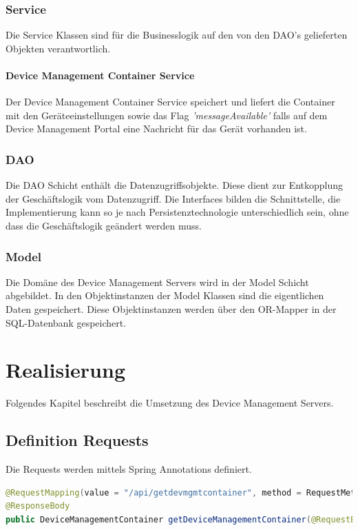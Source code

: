 \subsubsection{Service}
Die Service Klassen sind für die Businesslogik auf den von den DAO's gelieferten Objekten verantwortlich.

\paragraph{Device Management Container Service}
Der Device Management Container Service speichert und liefert die Container mit den Geräteeinstellungen sowie das Flag \textit{'messageAvailable'} falls auf dem Device Management Portal eine Nachricht für das Gerät vorhanden ist.

\subsubsection{DAO}
Die DAO Schicht enthält die Datenzugriffsobjekte. Diese dient zur Entkopplung der Geschäftslogik vom Datenzugriff. Die Interfaces bilden die Schnittstelle, die Implementierung kann so je nach Persistenztechnologie unterschiedlich sein, ohne dass die Geschäftslogik geändert werden muss.


\subsubsection{Model}
Die Domäne des Device Management Servers wird in der Model Schicht abgebildet. In den Objektinstanzen der Model Klassen sind die eigentlichen Daten gespeichert. Diese Objektinstanzen werden über den OR-Mapper in der SQL-Datenbank gespeichert.



\section{Realisierung}
Folgendes Kapitel beschreibt die Umsetzung des Device Management Servers.

\subsection{Definition Requests}
Die Requests werden mittels Spring Annotations definiert. 

\begin{lstlisting}[language=Java, caption=Spring Annotation]
@RequestMapping(value = "/api/getdevmgmtcontainer", method = RequestMethod.POST)
@ResponseBody
public DeviceManagementContainer getDeviceManagementContainer(@RequestBody final StatusData request)

\end{lstlisting}

